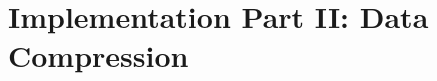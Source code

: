 \chapter{Implementation Part II: Data Compression}
\label{chap:Implementation Part II: Data Compression}


